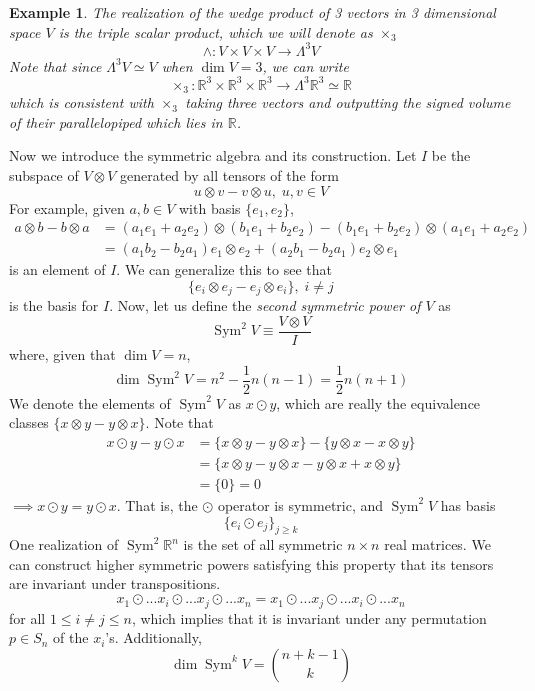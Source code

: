 \documentclass{article}
\DeclareMathOperator{\Sym}{Sym}
\newtheorem{example}{Example}[section]
\theoremstyle{remark}
\theoremstyle{definition}
\begin{document}
\begin{example}
The realization of the wedge product of 3 vectors in 3 dimensional space $V$ is the \textit{triple scalar product}, which we will denote as $\times_3$
\[\wedge: V \times V \times V \longrightarrow \Lambda^3 V\]
Note that since $\Lambda^3 V \simeq V$ when $\dim{V} = 3$, we can write 
\[\times_3: \mathbb{R}^3 \times \mathbb{R}^3 \times \mathbb{R}^3 \longrightarrow \Lambda^3 \mathbb{R}^3 \simeq \mathbb{R}\]
which is consistent with $\times_3$ taking three vectors and outputting the signed volume of their parallelopiped which lies in $\mathbb{R}$. 
\end{example}

Now we introduce the symmetric algebra and its construction. Let $I$ be the subspace of $V \otimes V$ generated by all tensors of the form 
\[u \otimes v - v \otimes u, \; u, v \in V\]
For example, given $a, b \in V$ with basis $\{e_1, e_2\}$, 
\begin{align*}
    a \otimes b - b \otimes a & = (a_1 e_1 + a_2 e_2) \otimes (b_1 e_1 + b_2 e_2) - (b_1 e_1 + b_2 e_2) \otimes (a_1 e_1 + a_2 e_2) \\
    & = (a_1 b_2 - b_2 a_1) e_1 \otimes e_2 + (a_2 b_1 - b_2 a_1) e_2 \otimes e_1 
\end{align*}
is an element of $I$. We can generalize this to see that
\[\{e_i \otimes e_j - e_j \otimes e_i\}, \; i \neq j\]
is the basis for $I$. Now, let us define the \textit{second symmetric power of $V$} as 
\[\Sym^2 V \equiv \frac{V \otimes V}{I}\]
where, given that $\dim{V} = n$, 
\[\dim{\Sym^2 V} = n^2 - \frac{1}{2} n (n-1) = \frac{1}{2} n (n+1)\]
We denote the elements of $\Sym^2 V$ as $x \odot y$, which are really the equivalence classes $\{x \otimes y - y \otimes x\}$. Note that
\begin{align*}
    x \odot y - y \odot x & = \{x \otimes y - y \otimes x\} - \{ y \otimes x - x \otimes y\} \\
    & = \{ x \otimes y - y \otimes x - y \otimes x + x \otimes y\} \\
    & = \{0\} = 0
\end{align*}
$\implies x \odot y = y \odot x$. That is, the $\odot$ operator is symmetric, and $\Sym^2 V$ has basis 
\[ \{e_i \odot e_j\}_{j \geq k}\]
One realization of $\Sym^2 \mathbb{R}^n$ is the set of all symmetric $n \times n$ real matrices. We can construct higher symmetric powers satisfying this property that its tensors are invariant under transpositions. 
\[x_1 \odot ... x_i \odot ... x_j \odot ... x_n = x_1 \odot ... x_j \odot ... x_i \odot ... x_n\]
for all $1 \leq i \neq j \leq n$, which implies that it is invariant under any permutation $p \in S_n$ of the $x_i$'s. Additionally, 
\[\dim{\Sym^k V} = \binom{n+k-1}{k}\]
\end{document}
